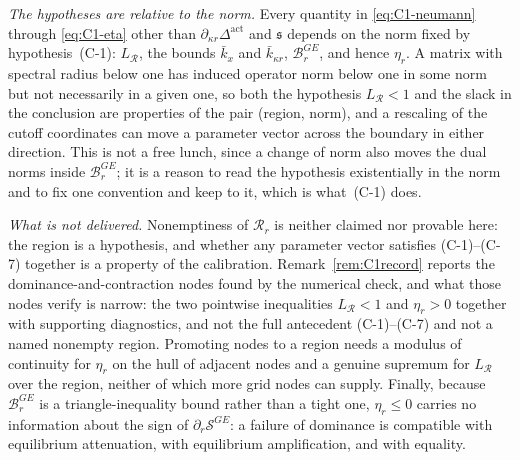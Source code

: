 \documentclass[11pt]{article}
\newcommand{\Dact}{\Delta^{\mathrm{act}}}
\begin{document}
\emph{The hypotheses are relative to the norm.} Every quantity in \eqref{eq:C1-neumann} through
\eqref{eq:C1-eta} other than $\partial_{\kappa r}\Dact$ and $\mathfrak s$ depends on the norm fixed
by hypothesis~(C-1): $L_{\mathcal R}$, the bounds $\bar k_x$ and $\bar k_{\kappa r}$,
$\mathcal B_r^{GE}$, and hence $\eta_r$. A matrix with spectral radius below one has induced
operator norm below one in some norm but not necessarily in a given one, so both the hypothesis
$L_{\mathcal R} < 1$ and the slack in the conclusion are properties of the pair (region, norm), and
a rescaling of the cutoff coordinates can move a parameter vector across the boundary in either
direction. This is not a free lunch, since a change of norm also moves the dual norms inside
$\mathcal B_r^{GE}$; it is a reason to read the hypothesis existentially in the norm and to fix one
convention and keep to it, which is what~(C-1) does.

\emph{What is not delivered.} Nonemptiness of $\mathcal R_r$ is neither claimed nor provable here:
the region is a hypothesis, and whether any parameter vector satisfies (C-1)--(C-7) together is a
property of the calibration. Remark~\ref{rem:C1record} reports the dominance-and-contraction nodes
found by the numerical check, and what those nodes verify is narrow: the two pointwise
inequalities $L_{\mathcal R} < 1$ and $\eta_r > 0$ together with supporting diagnostics, and not the
full antecedent (C-1)--(C-7) and not a named nonempty region. Promoting nodes to a region needs a
modulus of continuity for $\eta_r$ on the hull of adjacent nodes and a genuine supremum for
$L_{\mathcal R}$ over the region, neither of which more grid nodes can supply. Finally, because
$\mathcal B_r^{GE}$ is a triangle-inequality bound rather than a tight one, $\eta_r \le 0$ carries
no information about the sign of $\partial_r\mathcal S^{GE}$: a failure of dominance is compatible
with equilibrium attenuation, with equilibrium amplification, and with equality.
\end{document}
